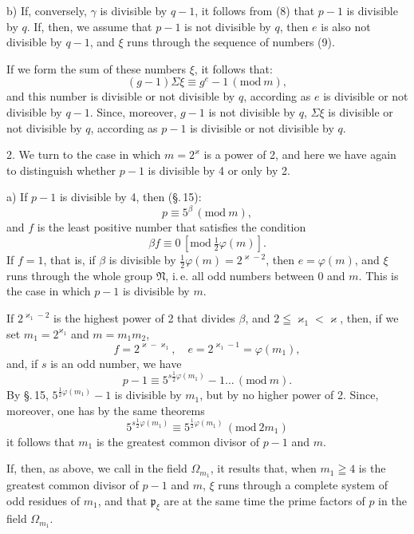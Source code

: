 b) If, conversely, $\gamma$ is divisible by $q-1$, it follows from (8) that $p-1$ is divisible by $q$. If, then, we assume that $p-1$ is not divisible by $q$, then $e$ is also not divisible by $q-1$, and $\xi$ runs through the sequence of numbers (9).

If we form the sum of these numbers $\xi$, it follows that:
\[ (g-1) \Sigma \xi \equiv g^e - 1 \, (\mathrm{mod}\ m), \]
and this number is divisible or not divisible by $q$, according as $e$ is divisible or not divisible by $q-1$. Since, moreover, $g-1$ is not divisible by $q$, $\Sigma\xi$ is divisible or not divisible by $q$, according as $p-1$ is divisible or not divisible by $q$.

2. We turn to the case in which $m = 2^\varkappa$ is a power of 2, and here we have again to distinguish whether $p-1$ is divisible by 4 or only by 2.

a) If $p-1$ is divisible by 4, then (\S.\,15):
\[ p \equiv 5^\beta \, (\mathrm{mod}\ m), \]
and $f$ is the least positive number that satisfies the condition
\[ \beta f \equiv 0 \, [\mathrm{mod}\ \tfrac{1}{2}\varphi(m)]. \]
If $f=1$, that is, if $\beta$ is divisible by $\tfrac{1}{2}\varphi(m) = 2^{\varkappa-2}$, then $e = \varphi(m)$, and $\xi$ runs through the whole group $\mathfrak{N}$, i.\,e. all odd numbers between 0 and $m$. This is the case in which $p-1$ is divisible by $m$.

If $2^{\varkappa_1-2}$ is the highest power of 2 that divides $\beta$, and $2 \leqq \varkappa_1 < \varkappa$, then, if we set $m_1 = 2^{\varkappa_1}$ and $m = m_1 m_2$,
\[ f = 2^{\varkappa - \varkappa_1}, \quad e = 2^{\varkappa_1 - 1} = \varphi(m_1), \]
and, if $s$ is an odd number, we have
\[ p - 1 \equiv 5^{s\tfrac{1}{2}\varphi(m_1)} - 1 \ldots \, (\mathrm{mod}\ m). \]
By \S.\,15, $5^{\tfrac{1}{2}\varphi(m_1)} - 1$ is divisible by $m_1$, but by no higher power of 2. Since, moreover, one has by the same theorems
\[ 5^{s\tfrac{1}{2}\varphi(m_1)} \equiv 5^{\tfrac{1}{2}\varphi(m_1)} \, (\mathrm{mod}\ 2m_1) \]
it follows that $m_1$ is the greatest common divisor of $p-1$ and $m$.

If, then, as above, we call in the field $\Omega_{m_1}$, it results that, when $m_1 \geqq 4$ is the greatest common divisor of $p-1$ and $m$, $\xi$ runs through a complete system of odd residues of $m_1$, and that $\mathfrak{p}_\xi$ are at the same time the prime factors of $p$ in the field $\Omega_{m_1}$.
